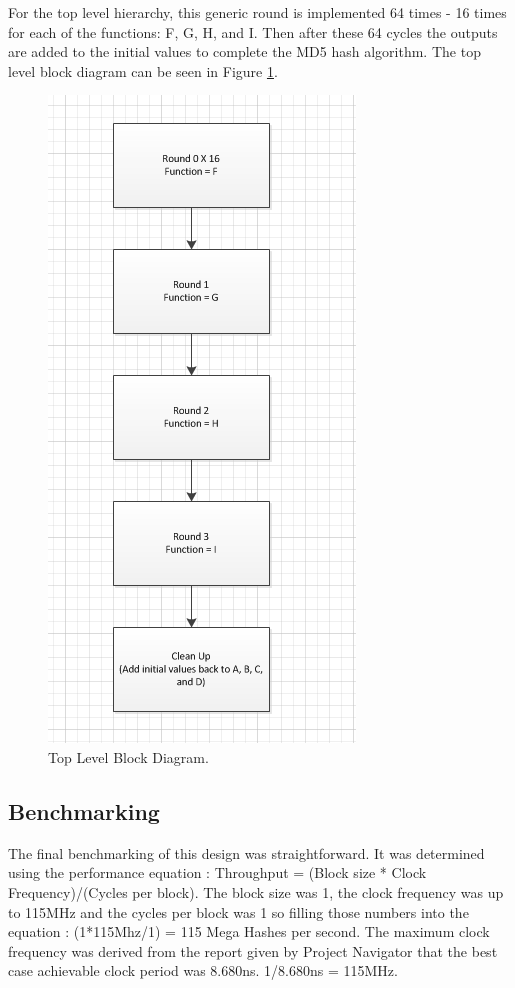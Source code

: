 		For the top level hierarchy, this generic round is implemented 64 times - 16 times for each of the functions: F, G, H, and I.  Then after these 64 cycles the outputs are added to the initial values to complete the MD5 hash algorithm.  The top level block diagram can be seen in Figure \ref{fig:Top}.
\begin{figure}[h]
\centering
\includegraphics[width=0.7\linewidth]{./Top}
\caption{Top Level Block Diagram.}
\label{fig:Top}
\end{figure}
	\subsection{Benchmarking}
		The final benchmarking of this design was straightforward.  It was determined using the performance equation : Throughput = (Block size * Clock Frequency)/(Cycles per block).  The block size was 1, the clock frequency was up to 115MHz and the cycles per block was 1 so filling those numbers into the equation : (1*115Mhz/1) = 115 Mega Hashes per second.  The maximum clock frequency was derived from the report given by Project Navigator that the best case achievable clock period was 8.680ns.  1/8.680ns = 115MHz.
